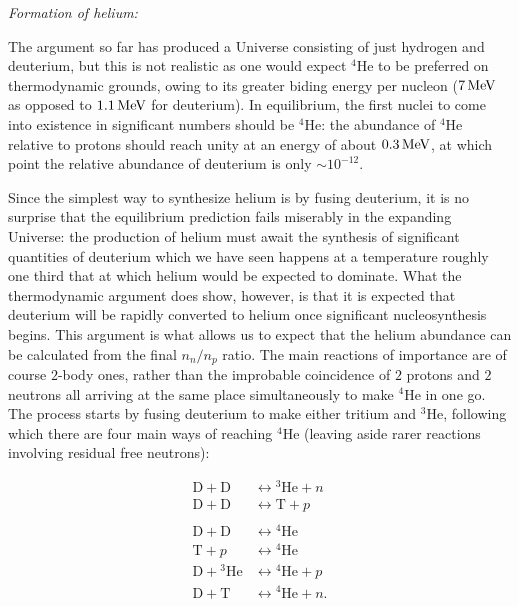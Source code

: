 \documentclass[a4paper,11pt]{article}
\begin{document}
{\noindent}\textit{Formation of helium:}

{\noindent}The argument so far has produced a Universe consisting of just hydrogen and deuterium, but this is not realistic as one would expect $^4$He to be preferred on thermodynamic grounds, owing to its greater biding energy per nucleon ($7\,{\rm MeV}$ as opposed to $1.1\,{\rm MeV}$ for deuterium). In equilibrium, the first nuclei to come into existence in significant numbers should be $^4$He: the abundance of $^4$He relative to protons should reach unity at an energy of about $0.3\,{\rm MeV}$, at which point the relative abundance of deuterium is only $\sim10^{-12}$.

{\noindent}Since the simplest way to synthesize helium is by fusing deuterium, it is no surprise that the equilibrium prediction fails miserably in the expanding Universe: the production of helium must await the synthesis of significant quantities of deuterium which we have seen happens at a temperature roughly one third that at which helium would be expected to dominate. What the thermodynamic argument does show, however, is that it is expected that deuterium will be rapidly converted to helium once significant nucleosynthesis begins. This argument is what allows us to expect that the helium abundance can be calculated from the final $n_n/n_p$ ratio. The main reactions of importance are of course $2$-body ones, rather than the improbable coincidence of $2$ protons and $2$ neutrons all arriving at the same place simultaneously to make $^4$He in one go. The process starts by fusing deuterium to make either tritium and $^3$He, following which there are four main ways of reaching $^4$He (leaving aside rarer reactions involving residual free neutrons):

\begin{align*}
    \mathrm{D} + \mathrm{D} &\leftrightarrow \mathrm{^3He} + n \\
    \mathrm{D} + \mathrm{D} &\leftrightarrow \mathrm{T} + p \\ \\
    \mathrm{D} + \mathrm{D} &\leftrightarrow \mathrm{^4He} \\
    \mathrm{T} + p &\leftrightarrow \mathrm{^4He} \\
    \mathrm{D} + \mathrm{^3He} &\leftrightarrow \mathrm{^4He} + p \\
    \mathrm{D} + \mathrm{T} &\leftrightarrow \mathrm{^4He} + n.
\end{align*}
\end{document}
